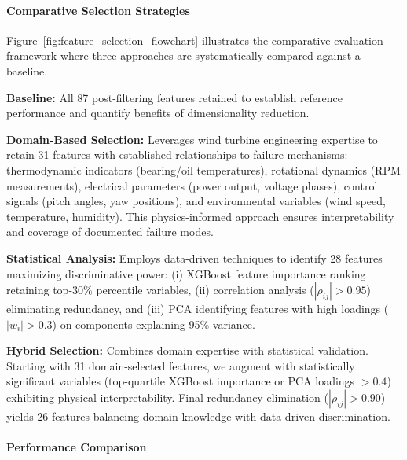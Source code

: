 \documentclass[12pt]{article}
\begin{document}
\paragraph{Comparative Selection Strategies}

Figure~\ref{fig:feature_selection_flowchart} illustrates the comparative evaluation framework where three approaches are systematically compared against a baseline.


\textbf{Baseline:} All 87 post-filtering features retained to establish reference performance and quantify benefits of dimensionality reduction.

\textbf{Domain-Based Selection:} Leverages wind turbine engineering expertise to retain 31 features with established relationships to failure mechanisms: thermodynamic indicators (bearing/oil temperatures), rotational dynamics (RPM measurements), electrical parameters (power output, voltage phases), control signals (pitch angles, yaw positions), and environmental variables (wind speed, temperature, humidity). This physics-informed approach ensures interpretability and coverage of documented failure modes.

\textbf{Statistical Analysis:} Employs data-driven techniques to identify 28 features maximizing discriminative power: (i) XGBoost feature importance ranking retaining top-30\% percentile variables, (ii) correlation analysis ($|\rho_{ij}| > 0.95$) eliminating redundancy, and (iii) PCA identifying features with high loadings ($|w_i| > 0.3$) on components explaining 95\% variance.

\textbf{Hybrid Selection:} Combines domain expertise with statistical validation. Starting with 31 domain-selected features, we augment with statistically significant variables (top-quartile XGBoost importance or PCA loadings $>0.4$) exhibiting physical interpretability. Final redundancy elimination ($|\rho_{ij}| > 0.90$) yields 26 features balancing domain knowledge with data-driven discrimination.

\paragraph{Performance Comparison}
\end{document}
